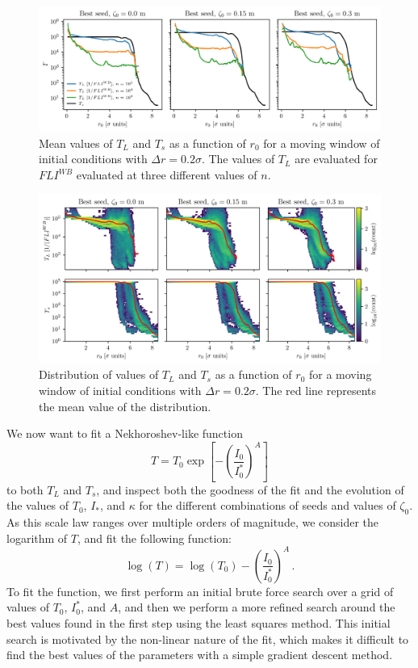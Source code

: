 \begin{figure}
    \centering
    \includegraphics[width=1\textwidth]{6_lhc_dynamic_indicators/figs/lyapunov_time_vs_radius.png}
    \caption{Mean values of $T_L$ and $T_s$ as a function of $r_0$ for a moving window of initial conditions with $\Delta r = 0.2\sigma$. The values of $T_L$ are evaluated for $FLI^{{WB}}$ evaluated at three different values of $n$.}
    \label{fig:ts_vs_tl}
\end{figure}

\begin{figure}
    \centering
    \includegraphics[width=1\textwidth]{6_lhc_dynamic_indicators/figs/dist_and_mean.png}
    \caption{Distribution of values of $T_L$ and $T_s$ as a function of $r_0$ for a moving window of initial conditions with $\Delta r = 0.2\sigma$. The red line represents the mean value of the distribution.}
    \label{fig:extra_distribution}
\end{figure}

We now want to fit a Nekhoroshev-like function
\begin{equation}
    T = T_0 \exp\left[-\left(\frac{I_0}{I_0^*}\right)^A\right]
\end{equation} 
to both $T_L$ and $T_s$, and inspect both the goodness of the fit and the evolution of the values of $T_0$, $I_\ast$, and $\kappa$ for the different combinations of seeds and values of $\zeta_0$. As this scale law ranges over multiple orders of magnitude, we consider the logarithm of $T$, and fit the following function:
\begin{equation}
    \log(T) = \log(T_0) - \left(\frac{I_0}{I_0^*}\right)^A \,.
\end{equation}
To fit the function, we first perform an initial brute force search over a grid of values of $T_0$, $I_0^*$, and $A$, and then we perform a more refined search around the best values found in the first step using the least squares method. This initial search is motivated by the non-linear nature of the fit, which makes it difficult to find the best values of the parameters with a simple gradient descent method.

